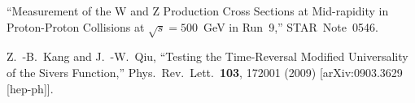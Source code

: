 \documentclass[12pt]{article}
\begin{document}


\newpage

\begin{thebibliography}{9}

``Measurement of the W and Z Production Cross Sections at Mid-rapidity in Proton-Proton Collisions at $\sqrt{s} = 500$~GeV in Run~9,'' STAR~Note~0546.

  Z.~-B.~Kang and J.~-W.~Qiu,
  ``Testing the Time-Reversal Modified Universality of the Sivers Function,''
  Phys.\ Rev.\ Lett.\  {\bf 103}, 172001 (2009)
  [arXiv:0903.3629 [hep-ph]].

\end{thebibliography}
\end{document}
